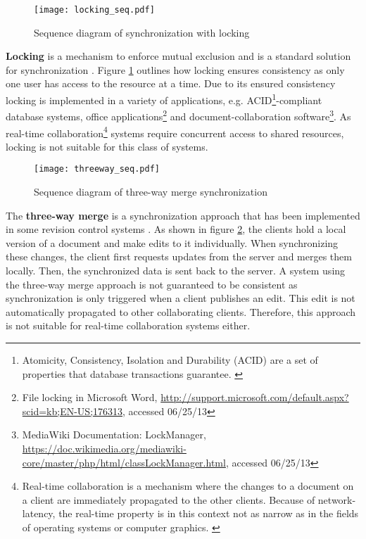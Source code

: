 \begin{figure}[!h]
\begin{center}
\texttt{[image: locking\_seq.pdf]}
\caption{Sequence diagram of synchronization with locking}
\label{fig:locking}
\end{center}
\end{figure}

\textbf{Locking} is a mechanism to enforce mutual exclusion and is a standard solution for synchronization \cite{Dijkstra_1965}. Figure \ref{fig:locking} outlines how locking ensures consistency as only one user has access to the resource at a time. Due to its ensured consistency locking is implemented in a variety of applications, e.g. ACID\footnote{Atomicity, Consistency, Isolation and Durability (ACID) are a set of properties that database transactions guarantee. \cite{Gray_1981}}-compliant database systems, office applications\footnote{File locking in Microsoft Word, \url{http://support.microsoft.com/default.aspx?scid=kb;EN-US;176313}, accessed 06/25/13} and document-collaboration software\footnote{MediaWiki Documentation: LockManager, \url{https://doc.wikimedia.org/mediawiki-core/master/php/html/classLockManager.html}, accessed 06/25/13}. As real-time collaboration\footnote{Real-time collaboration is a mechanism where the changes to a document on a client are immediately propagated to the other clients. Because of network-latency, the real-time property is in this context not as narrow as in the fields of operating systems or computer graphics. \cite{Sun_2002}} systems require concurrent access to shared resources, locking is not suitable for this class of systems.

\begin{figure}[!h]
\begin{center}
\texttt{[image: threeway\_seq.pdf]}
\caption{Sequence diagram of three-way merge synchronization}
\label{fig:threeway}
\end{center}
\end{figure}

The \textbf{three-way merge} is a synchronization approach that has been implemented in some revision control systems \cite{Pilato_2008}. As shown in figure \ref{fig:threeway}, the clients hold a local version of a document and make edits to it individually. When synchronizing these changes, the client first requests updates from the server and merges them locally. Then, the synchronized data is sent back to the server. A system using the three-way merge approach is not guaranteed to be consistent as synchronization is only triggered when a client publishes an edit. This edit is not automatically propagated to other collaborating clients. Therefore, this approach is not suitable for real-time collaboration systems either.

